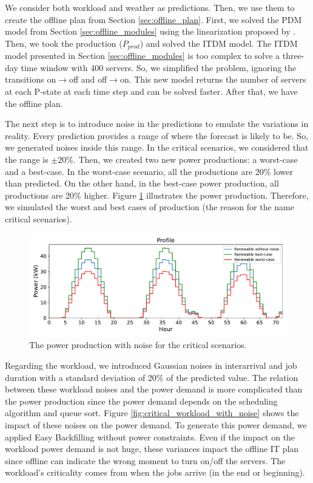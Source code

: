 We consider both workload and weather as predictions. Then, we use them to create the offline plan from Section \ref{sec:offline_plan}. First, we solved the PDM model from Section \ref{sec:offline_modules} using the linearization proposed by \citeauthor{haddad2019mixed} \cite{haddad2019mixed}. Then, we took the production ($P_{prod}$) and solved the ITDM model. The ITDM model presented in Section \ref{sec:offline_modules} is too complex to solve a three-day time window with 400 servers. So, we simplified the problem, ignoring the transitions on$\rightarrow$off and off$\rightarrow$on. This new model returns the number of servers at each P-state at each time step and can be solved faster. After that, we have the offline plan. 

The next step is to introduce noise in the predictions to emulate the variations in reality. Every prediction provides a range of where the forecast is likely to be. So, we generated noises inside this range. In the critical scenarios, we considered that the range is $\pm 20\%$. Then, we created two new power productions: a worst-case and a best-case. In the worst-case scenario, all the productions are 20\% lower than predicted. On the other hand, in the best-case power production, all productions are 20\% higher. Figure \ref{fig:critical_weather_with_noise} illustrates the power production. Therefore, we simulated the worst and best cases of production (the reason for the name critical scenarios).

\begin{figure}[!htb]
    \centering
    \includegraphics[scale=0.58]{Images/Compensations/critical_power_production_with_noise.pdf}
    \caption{The power production with noise for the critical scenarios.}
    \label{fig:critical_weather_with_noise}
\end{figure}

Regarding the workload, we introduced Gaussian noises in interarrival and job duration with a standard deviation of 20\% of the predicted value. The relation between these workload noises and the power demand is more complicated than the power production since the power demand depends on the scheduling algorithm and queue sort. Figure \ref{fig:critical_workload_with_noise} shows the impact of these noises on the power demand. To generate this power demand, we applied Easy Backfilling without power constraints. Even if the impact on the workload power demand is not huge, these variances impact the offline IT plan since offline can indicate the wrong moment to turn on/off the servers. The workload's criticality comes from when the jobs arrive (in the end or beginning).

